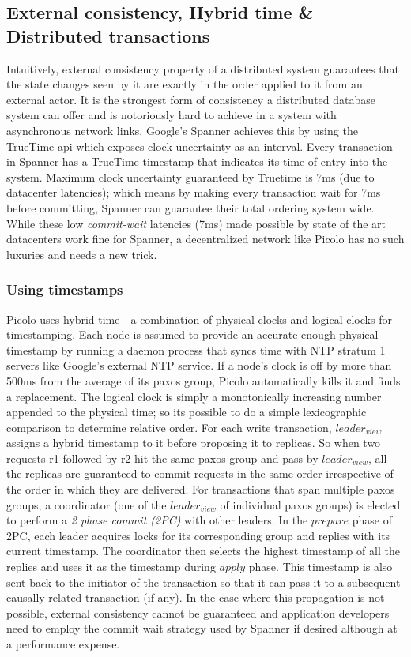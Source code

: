 \subsection{External consistency, Hybrid time \& Distributed transactions} \label{sec:hybrid_time}
Intuitively, external consistency property \cite{External_Consistency} of a distributed system guarantees that the state changes seen by it are exactly in the order applied to it from an external actor. It is the strongest form of consistency a distributed database system can offer and is notoriously hard to achieve in a system with asynchronous network links. Google's Spanner \cite{spanner} achieves this by using the TrueTime api which exposes clock uncertainty as an interval. Every transaction in Spanner has a TrueTime timestamp that indicates its time of entry into the system. Maximum clock uncertainty guaranteed by Truetime is 7ms (due to datacenter latencies); which means by making every transaction wait for 7ms before committing, Spanner can guarantee their total ordering system wide. While these low \textit{commit-wait} latencies (7ms) made possible by state of the art datacenters work fine for Spanner, a decentralized network like Picolo has no such luxuries and needs a new trick.
\subsubsection{Using timestamps}
Picolo uses hybrid time \cite{hybrid_time} - a combination of physical clocks and logical clocks for timestamping. Each node is assumed to provide an accurate enough physical timestamp by running a daemon process that syncs time with NTP stratum 1 servers like Google's external NTP service. If a node's clock is off by more than 500ms from the average of its paxos group, Picolo automatically kills it and finds a replacement. The logical clock is simply a monotonically increasing number appended to the physical time; so its possible to do a simple lexicographic comparison to determine relative order. For each write transaction, $leader_{view}$ assigns a hybrid timestamp to it before proposing it to replicas. So when two requests r1 followed by r2 hit the same paxos group and pass by $leader_{view}$, all the replicas are guaranteed to commit requests in the same order irrespective of the order in which they are delivered. For transactions that span multiple paxos groups, a coordinator (one of the $leader_{view}$ of individual paxos groups) is elected to perform a \textit{2 phase commit (2PC)} with other leaders. In the $prepare$ phase of 2PC, each leader acquires locks for its corresponding group and replies with its current timestamp. The coordinator then selects the highest timestamp of all the replies and uses it as the timestamp during $apply$ phase. This timestamp is also sent back to the initiator of the transaction so that it can pass it to a subsequent causally related transaction (if any). In the case where this propagation is not possible, external consistency cannot be guaranteed and application developers need to employ the commit wait strategy used by Spanner if desired although at a performance expense.
